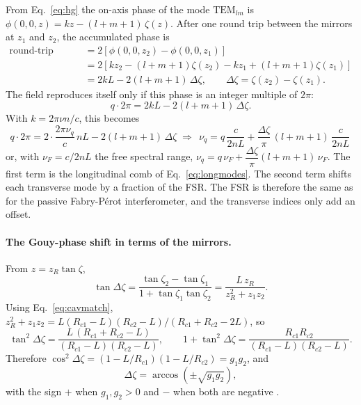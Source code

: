 \documentclass[11pt,a4paper]{article}
\begin{document}
	From Eq.~\eqref{eq:hg} the on-axis phase of the mode $\mathrm{TEM}_{lm}$ is $\phi(0,0,z)=kz-(l+m+1)\,\zeta(z)$. After one round trip between the mirrors at $z_1$ and $z_2$, the accumulated phase is
	\begin{align}
		\text{round-trip phase}&=2\left[\phi(0,0,z_2)-\phi(0,0,z_1)\right]\nonumber\\
		&=2\left[kz_2-(l+m+1)\zeta(z_2)-kz_1+(l+m+1)\zeta(z_1)\right]\nonumber\\
		&=2kL-2(l+m+1)\,\Delta\zeta,\qquad \Delta\zeta=\zeta(z_2)-\zeta(z_1).
	\end{align}
	The field reproduces itself only if this phase is an integer multiple of $2\pi$:
	\begin{equation}
		q\cdot2\pi=2kL-2(l+m+1)\,\Delta\zeta .
	\end{equation}
	With $k=2\pi\nu n/c$, this becomes
	\begin{equation}
		q\cdot2\pi=2\cdot\frac{2\pi\nu_q}{c}\,nL-2(l+m+1)\,\Delta\zeta
		\;\Longrightarrow\;
		\boxed{\,\nu_q=q\,\frac{c}{2nL}+\frac{\Delta\zeta}{\pi}\,(l+m+1)\,\frac{c}{2nL}\,}
		\label{eq:transfreq}
	\end{equation}
	or, with $\nu_F=c/2nL$ the free spectral range, $\nu_q=q\,\nu_F+\dfrac{\Delta\zeta}{\pi}(l+m+1)\,\nu_F$. The first term is the longitudinal comb of Eq.~\eqref{eq:longmodes}. The second term shifts each transverse mode by a fraction of the FSR. The FSR is therefore the same as for the passive Fabry-P\'erot interferometer, and the transverse indices only add an offset.
	
	\paragraph{The Gouy-phase shift in terms of the mirrors.} From $z=z_R\tan\zeta$,
	\begin{equation}
		\tan\Delta\zeta=\frac{\tan\zeta_2-\tan\zeta_1}{1+\tan\zeta_1\tan\zeta_2}=\frac{L\,z_R}{z_R^2+z_1z_2}.
	\end{equation}
	Using Eq.~\eqref{eq:cavmatch}, $z_R^2+z_1z_2=L(R_{c1}-L)(R_{c2}-L)/(R_{c1}+R_{c2}-2L)$, so
	\begin{equation}
		\tan^2\Delta\zeta=\frac{L\,(R_{c1}+R_{c2}-L)}{(R_{c1}-L)(R_{c2}-L)},\qquad
		1+\tan^2\Delta\zeta=\frac{R_{c1}R_{c2}}{(R_{c1}-L)(R_{c2}-L)} .
	\end{equation}
	Therefore $\cos^2\Delta\zeta=(1-L/R_{c1})(1-L/R_{c2})=g_1g_2$, and
	\begin{equation}
		\Delta\zeta=\arccos\!\left(\pm\sqrt{g_1g_2}\right),
		\label{eq:dzeta}
	\end{equation}
	with the sign $+$ when $g_1,g_2>0$ and $-$ when both are negative \cite{KogelnikLi1966,Siegman}.
	
\end{document}
